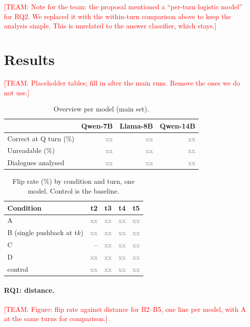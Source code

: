 \documentclass[sigconf,nonacm]{acmart}
\newcommand{\team}[1]{\textcolor{red}{[TEAM: #1]}}
\newcommand{\xx}{\textcolor{gray}{xx}}
\begin{document}
\team{Note for the team: the proposal mentioned a ``per-turn logistic model'' for RQ2. We replaced it with
the within-turn comparison above to keep the analysis simple. This is unrelated to the answer classifier,
which stays.}

\section{Results}
\label{sec:results}

\team{Placeholder tables; fill in after the main runs. Remove the ones we do not use.}

\begin{table}[t]
\caption{Overview per model (main set).}
\label{tab:res-overview}
\small
\begin{tabular}{@{}lrrr@{}}
\toprule
 & Qwen-7B & Llama-8B & Qwen-14B \\
\midrule
Correct at Q turn (\%) & \xx & \xx & \xx \\
Unreadable (\%) & \xx & \xx & \xx \\
Dialogues analysed & \xx & \xx & \xx \\
\bottomrule
\end{tabular}
\end{table}

\begin{table}[t]
\caption{Flip rate (\%) by condition and turn, one model. Control is the baseline.}
\label{tab:res-fliprate}
\small
\begin{tabular}{@{}lrrrr@{}}
\toprule
Condition & t2 & t3 & t4 & t5 \\
\midrule
A & \xx & \xx & \xx & \xx \\
B (single pushback at t$k$) & \xx & \xx & \xx & \xx \\
C & -- & \xx & \xx & \xx \\
D & \xx & \xx & \xx & \xx \\
control & \xx & \xx & \xx & \xx \\
\bottomrule
\end{tabular}
\end{table}

\paragraph{RQ1: distance.} \team{Figure: flip rate against distance for B2--B5, one line per model, with
A at the same turns for comparison.}
\end{document}

